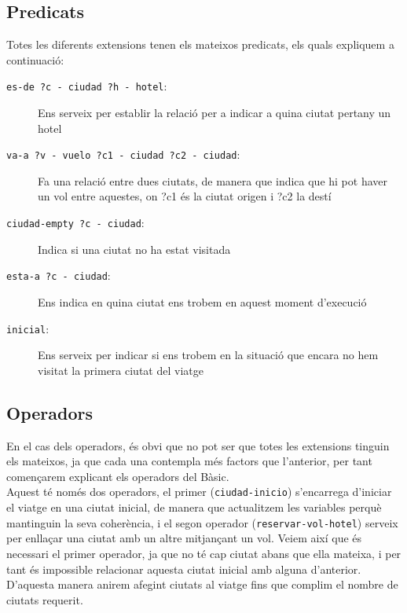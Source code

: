 \documentclass[11pt,a4paper]{article}
\begin{document}
\subsection{Predicats}
Totes les diferents extensions tenen els mateixos predicats, els quals expliquem a continuació:\\

\begin{description}
\item[\texttt{es-de ?c - ciudad ?h - hotel}:] Ens serveix per establir la relació per a indicar a quina ciutat pertany un hotel\\

\item[\texttt{va-a ?v - vuelo ?c1 - ciudad ?c2 - ciudad}:] Fa una relació entre dues ciutats, de manera que indica que hi pot haver un vol entre aquestes, on ?c1 és la ciutat origen i ?c2 la destí\\

\item[\texttt{ciudad-empty ?c - ciudad}:] Indica si una ciutat no ha estat visitada\\

\item[\texttt{esta-a ?c - ciudad}:] Ens indica en quina ciutat ens trobem en aquest moment d'execució\\

\item[\texttt{inicial}:] Ens serveix per indicar si ens trobem en la situació que encara no hem visitat la primera ciutat del viatge\\
\end{description}

\subsection{Operadors}

En el cas dels operadors, és obvi que no pot ser que totes les extensions tinguin els mateixos, ja que cada una contempla més factors que l'anterior, per tant començarem explicant els operadors del Bàsic.\\

Aquest té només dos operadors, el primer (\texttt{ciudad-inicio}) s'encarrega d'iniciar el viatge en una ciutat inicial, de manera que actualitzem les variables perquè mantinguin la seva coherència, i el segon operador (\texttt{reservar-vol-hotel}) serveix per enllaçar una ciutat amb un altre mitjançant un vol. Veiem així que és necessari el primer operador, ja que no té cap ciutat abans que ella mateixa, i per tant és impossible relacionar aquesta ciutat inicial amb alguna d'anterior. D'aquesta manera anirem afegint ciutats al viatge fins que complim el nombre de ciutats requerit.\\
\end{document}
